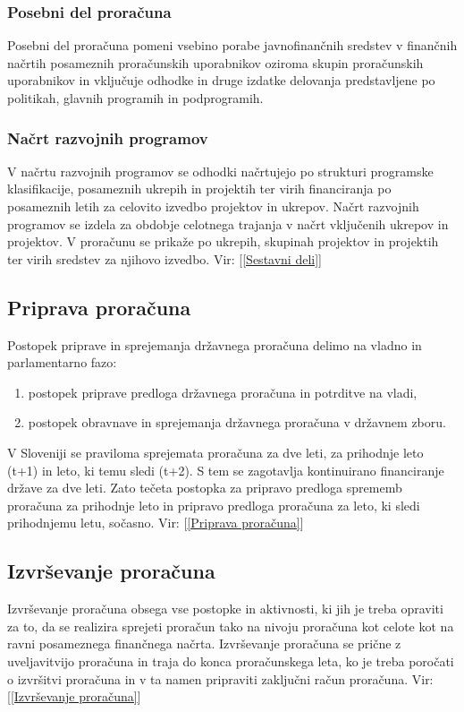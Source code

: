 \documentclass[12pt, a4paper]{article}
\begin{document}
\subsubsection[Posebni del proračuna]{Posebni del proračuna}
\hspace*{5mm} Posebni del proračuna pomeni vsebino porabe javnofinančnih sredstev v finančnih načrtih posameznih proračunskih uporabnikov oziroma skupin proračunskih uporabnikov in vključuje odhodke in druge izdatke delovanja predstavljene po politikah, glavnih programih in podprogramih. 

\subsubsection[Načrt razvojnih programov]{Načrt razvojnih programov}
\hspace*{5mm} V načrtu razvojnih programov se odhodki načrtujejo po strukturi programske klasifikacije, posameznih ukrepih in projektih ter virih financiranja po posameznih letih za celovito izvedbo projektov in ukrepov. Načrt razvojnih programov se izdela za obdobje celotnega trajanja v načrt vključenih ukrepov in projektov. V proračunu se prikaže po ukrepih, skupinah projektov in projektih ter virih sredstev za njihovo izvedbo. Vir: [\ref{Sestavni deli}]

\subsection[Priprava proračuna]{Priprava proračuna}
\hspace*{5mm} Postopek priprave in sprejemanja državnega proračuna delimo na vladno in parlamentarno fazo:
\begin{enumerate}
\item postopek priprave predloga državnega proračuna in potrditve na vladi,
\item postopek obravnave in sprejemanja državnega proračuna v državnem zboru.
\end{enumerate}
\hspace*{5mm} V Sloveniji se praviloma sprejemata proračuna za dve leti, za prihodnje leto (t+1) in leto, ki temu sledi (t+2). S tem se zagotavlja kontinuirano financiranje države za dve leti. Zato tečeta postopka za pripravo predloga sprememb proračuna za prihodnje leto in pripravo predloga proračuna za leto, ki sledi prihodnjemu letu, sočasno. Vir: [\ref{Priprava proračuna}]

\subsection[Izvrševanje proračuna]{Izvrševanje proračuna}
\hspace*{5mm} Izvrševanje proračuna obsega vse postopke in aktivnosti, ki jih je treba opraviti za to, da se realizira sprejeti proračun tako na nivoju proračuna kot celote kot na ravni posameznega finančnega načrta. Izvrševanje proračuna se prične z uveljavitvijo proračuna in traja do konca proračunskega leta, ko je treba poročati o izvršitvi proračuna in v ta namen pripraviti zaključni račun proračuna. Vir: [\ref{Izvrševanje proračuna}]
\end{document}
